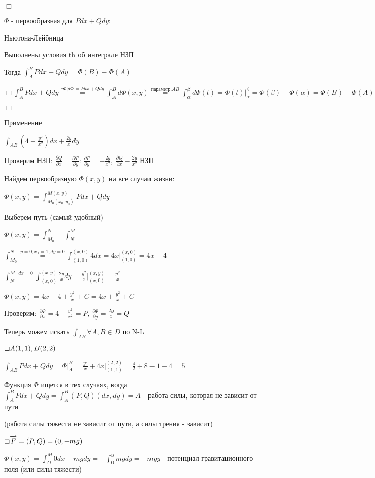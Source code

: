\documentclass[12pt]{article}
\begin{document}
    $\Box$

    \Nota $\Phi$ - первообразная для $Pdx + Qdy$:

    \Th Ньютона-Лейбница

    Выполнены условия th об интеграле НЗП

    Тогда $\displaystyle \int_A^B Pdx + Qdy = \Phi(B) - \Phi(A)$

    $\displaystyle \Box \int_A^B Pdx + Qdy \stackrel{\exists \Phi | d\Phi = Pdx + Qdy}{=} \int_A^B d\Phi(x, y) \stackrel{\text{параметр.} AB}{=}
    \int_\alpha^\beta d\Phi(t) = \Phi(t) \Big|_\alpha^\beta = \Phi(\beta) - \Phi(\alpha) = \Phi(B) - \Phi(A)$

    $\Box$

    \underline{Применение}

    \Ex $\displaystyle \int_{AB} (4 - \frac{y^2}{x^2})dx + \frac{2y}{x}dy$

    Проверим НЗП: $\displaystyle \frac{\partial Q}{\partial x} = \frac{\partial P}{\partial y}$: $\displaystyle \frac{\partial P}{\partial y} = -\frac{2y}{x^2}$, $\displaystyle \frac{\partial Q}{\partial x} -\frac{2y}{x^2}$ \Longleftrightarrow НЗП

    Найдем первообразную $\Phi(x, y)$ на все случаи жизни:

    $\displaystyle \Phi(x, y) = \int_{M_0(x_0, y_0)}^{M(x, y)} Pdx + Qdy$

    Выберем путь (самый удобный)

    $\displaystyle \Phi(x, y) = \int_{M_0}^{N} + \int_{N}^{M}$

    $\displaystyle \int_{M_0}^{N} \stackrel{y = 0, x_0 = 1, dy = 0}{=} \int_{(1, 0)}^{(x, 0)} 4 dx = 4x \Big|_{(1,0)}^{(x,0)} = 4x - 4$

    $\displaystyle \int_{N}^{M} \stackrel{dx = 0}{=} \int_{(x, 0)}^{(x, y)} \frac{2y}{x} dy = \frac{y^2}{x} \Big|_{(x,0)}^{(x,y)} = \frac{y^2}{x}$

    $\displaystyle \Phi(x, y) = 4x - 4 + \frac{y^2}{x} + C = 4x + \frac{y^2}{x} + C$

    Проверим: $\displaystyle \frac{\partial \Phi}{\partial x} = 4 - \frac{y^2}{x^2} = P$, $\displaystyle \frac{\partial \Phi}{\partial y} = \frac{2y}{x} = Q$

    Теперь можем искать $\displaystyle \int_{AB} \forall A, B \in D$ по N-L

    $\mathord{\sqsupset} A(1, 1), B(2, 2)$

    $\displaystyle \int_{AB} Pdx + Qdy = \Phi \Big|_A^B = \frac{y^2}{x} + 4x \Big|_{(1,1)}^{(2,2)} = \frac{4}{2} + 8 - 1 - 4 = 5$

    \Nota Функция $\Phi$ ищется в тех случаях, когда $\displaystyle \int_A^B Pdx + Qdy = \int^B_A (P, Q) (dx, dy) = A$ - работа силы, которая не зависит от пути

    (\Exs работа силы тяжести не зависит от пути, а силы трения - зависит)

    \Ex $\mathord{\sqsupset} \overrightarrow{F} = (P, Q) = (0, -mg)$

    $\displaystyle \Phi(x, y) = \int_O^M 0dx - mgdy = -\int_0^y mgdy = -mgy$ - потенциал гравитационного поля (или силы тяжести)
\end{document}
